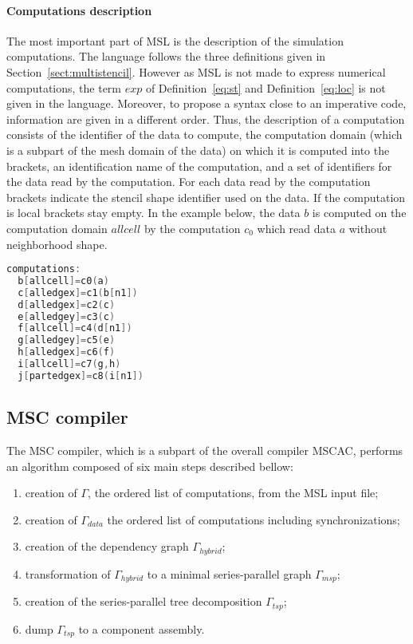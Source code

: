 \paragraph{Computations description} The most important part of MSL is the description of the simulation computations. The language follows the three definitions given in Section~\ref{sect:multistencil}. However as MSL is not made to express numerical computations, the term $exp$ of Definition~\ref{eq:st} and Definition~\ref{eq:loc} is not given in the language. Moreover, to propose a syntax close to an imperative code, information are given in a different order.
Thus, the description of a computation consists of the identifier of the data to compute, the computation domain (which is a subpart of the mesh domain of the data) on which it is computed into the brackets, an identification name of the computation, and a set of identifiers for the data read by the computation. For each data read by the computation brackets indicate the stencil shape identifier used on the data. If the computation is local brackets stay empty. In the example below, the data $b$ is computed on the computation domain $allcell$ by the computation $c_0$ which read data $a$ without neighborhood shape.
\begin{lstlisting}[basicstyle=\small,mathescape,frame=single,language=C++]
computations:
  b[allcell]=c0(a)
  c[alledgex]=c1(b[n1])
  d[alledgex]=c2(c)
  e[alledgey]=c3(c)
  f[allcell]=c4(d[n1])
  g[alledgey]=c5(e)
  h[alledgex]=c6(f)
  i[allcell]=c7(g,h)
  j[partedgex]=c8(i[n1])
\end{lstlisting}

\subsection{MSC compiler}
The MSC compiler, which is a subpart of the overall compiler MSCAC, performs an algorithm composed of six main steps described bellow:

\begin{enumerate}
\item creation of $\Gamma$, the ordered list of computations, from the MSL input file;
\item creation of $\Gamma_{data}$ the ordered list of computations including synchronizations;
\item creation of the dependency graph $\Gamma_{hybrid}$;
\item transformation of $\Gamma_{hybrid}$ to a minimal series-parallel graph $\Gamma_{msp}$;
\item creation of the series-parallel tree decomposition $\Gamma_{tsp}$;
\item dump $\Gamma_{tsp}$ to a component assembly.
\end{enumerate}

